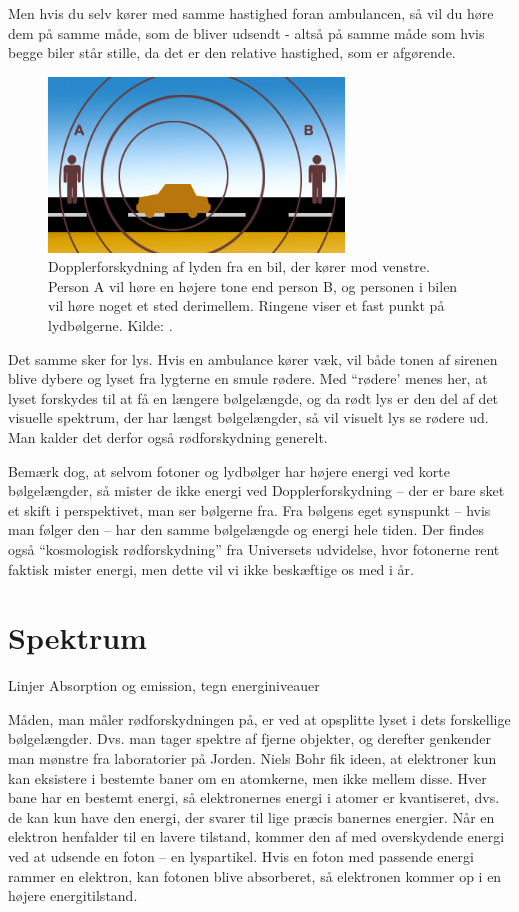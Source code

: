 \documentclass[crop=false, class=memoir]{standalone}
\begin{document}
Men hvis du selv kører med samme hastighed foran ambulancen, så vil du høre dem på samme måde, som de bliver udsendt - altså på samme måde som hvis begge biler står stille, da det er den relative hastighed, som er afgørende.
    
\begin{figure}[H]
	\centering
	\includegraphics[width=0.7\textwidth]{fig/doppler.jpg}
	\caption{Dopplerforskydning af lyden fra en bil, der kører mod venstre. Person A vil høre en højere tone end person B, og personen i bilen vil høre noget et sted derimellem. Ringene viser et fast punkt på lydbølgerne. Kilde: \cite{DopplerIllustration}.}
	\label{stjerner:fig:doppler} 
\end{figure}
    
Det samme sker for lys. Hvis en ambulance kører væk, vil både tonen af sirenen blive dybere og lyset fra lygterne en smule rødere. Med ``rødere' menes her, at lyset forskydes til at få en længere bølgelængde, og da rødt lys er den del af det visuelle spektrum, der har længst bølgelængder, så vil visuelt lys se rødere ud. Man kalder det derfor også rødforskydning generelt.

Bemærk dog, at selvom fotoner og lydbølger har højere energi ved korte bølgelængder, så mister de ikke energi ved Dopplerforskydning -- der er bare sket et skift i perspektivet, man ser bølgerne fra. Fra bølgens eget synspunkt -- hvis man følger den -- har den samme bølgelængde og energi hele tiden. Der findes også ``kosmologisk rødforskydning'' fra Universets udvidelse, hvor fotonerne rent faktisk mister energi, men dette vil vi ikke beskæftige os med i år.

\section{Spektrum}
Linjer
Absorption og emission, tegn energiniveauer
    
Måden, man måler rødforskydningen på, er ved at opsplitte lyset i dets forskellige bølgelængder. Dvs. man tager spektre af fjerne objekter, og derefter genkender man mønstre fra laboratorier på Jorden. Niels Bohr fik ideen, at elektroner kun kan eksistere i bestemte baner om en atomkerne, men ikke mellem disse. Hver bane har en bestemt energi, så elektronernes energi i atomer er kvantiseret, dvs. de kan kun have den energi, der svarer til lige præcis banernes energier. %
Når en elektron henfalder til en lavere tilstand, kommer den af med overskydende energi ved at udsende en foton -- en lyspartikel. Hvis en foton med passende energi rammer en elektron, kan fotonen blive absorberet, så elektronen kommer op i en højere energitilstand. 
    
\end{document}
